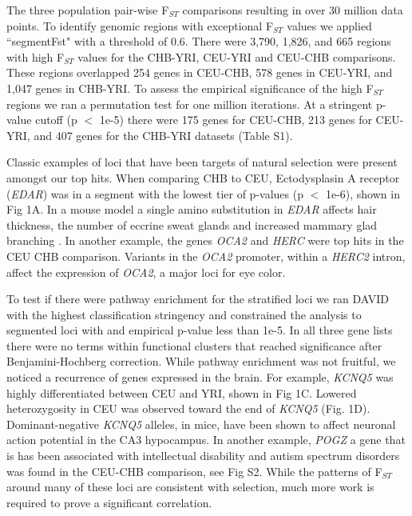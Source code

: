 \documentclass[10pt,letterpaper]{article}
\begin{document}
The three population pair-wise F$_{ST}$ comparisons resulting in over 30 million data points. To identify genomic regions with exceptional  F$_{ST}$ values we applied ``segmentFst" with a threshold of 0.6.   There were 3,790, 1,826, and 665 regions with high F$_{ST}$  values for the CHB-YRI, CEU-YRI and CEU-CHB comparisons.  These regions overlapped 254 genes in CEU-CHB, 578 genes in CEU-YRI, and 1,047 genes in CHB-YRI.   To assess the empirical significance of the high  F$_{ST}$ regions we ran a permutation test for one million iterations.  At a stringent p-value cutoff (p $<$ 1e-5) there were 175 genes for CEU-CHB, 213 genes for CEU-YRI, and 407 genes for the CHB-YRI datasets (Table S1).   

Classic examples of loci that have been targets of natural selection were present amongst our top hits. When comparing CHB to CEU, Ectodysplasin A receptor (\textit{EDAR}) was in a segment with the lowest tier of p-values (p $<$ 1e-6), shown in Fig 1A. In a mouse model a single amino substitution in \textit{EDAR} affects hair thickness, the number of eccrine sweat glands and increased mammary glad branching \cite{edar}. In another example, the genes \textit{OCA2} and \textit{HERC} were top hits in the CEU CHB comparison.  Variants in the \textit{OCA2} promoter, within a \textit{HERC2} intron, affect the expression of \textit{OCA2}, a major loci for eye color\cite{oca2}.  

To test if there were  pathway enrichment for the stratified loci we ran DAVID with the highest classification stringency and constrained the analysis to segmented loci with and empirical p-value less than 1e-5\cite{david}. In all three gene lists there were no terms within functional clusters that reached significance after Benjamini-Hochberg correction.  While pathway enrichment was not fruitful, we noticed a recurrence of genes expressed in the brain.  For example, \textit{KCNQ5} was highly differentiated between CEU and YRI, shown in Fig 1C.  Lowered heterozygosity in CEU was observed toward the end of \textit{KCNQ5}  (Fig. 1D).  Dominant-negative \textit{KCNQ5} alleles, in mice, have been shown to affect neuronal action potential in the CA3 hypocampus\cite{kcnq5}.  In another example, \textit{POGZ } a gene that is has been associated with intellectual disability and autism spectrum disorders was found in the CEU-CHB comparison, see Fig S2.  While the patterns of F$_{ST}$ around many of these loci are consistent with selection, much more work is required to prove a significant correlation.
\end{document}
